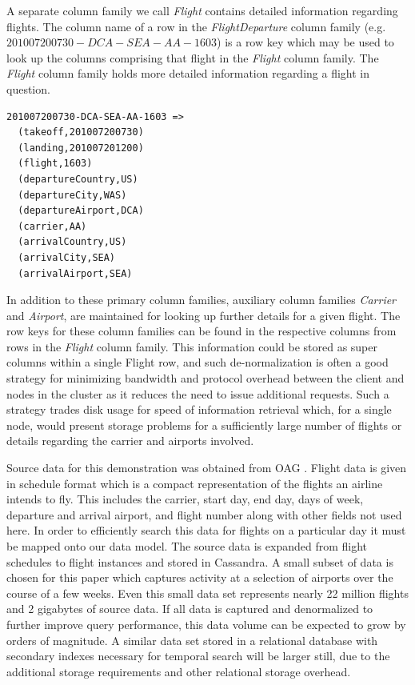 \documentclass[twocolumn]{article}
\begin{document}
A separate column family we call \emph{Flight} contains detailed information regarding flights.  The column name of a row in the \emph{FlightDeparture} column family (e.g.\ $201007200730-DCA-SEA-AA-1603$) is a row key which may be used to look up the columns comprising that flight in the \emph{Flight} column family.  The \emph{Flight} column family holds more detailed information regarding a flight in question.

\begin{verbatim}
201007200730-DCA-SEA-AA-1603 =>
  (takeoff,201007200730)  
  (landing,201007201200)
  (flight,1603)         
  (departureCountry,US)   
  (departureCity,WAS)     
  (departureAirport,DCA)  
  (carrier,AA)            
  (arrivalCountry,US)     
  (arrivalCity,SEA)       
  (arrivalAirport,SEA)    
\end{verbatim}

In addition to these primary column families, auxiliary column families \emph{Carrier} and \emph{Airport}, are maintained for looking up further details for a given flight.  The row keys for these column families can be found in the respective columns from rows in the \emph{Flight} column family.  This information could be stored as super columns within a single Flight row, and such de-normalization is often a good strategy for minimizing bandwidth and protocol overhead between the client and nodes in the cluster as it reduces the need to issue additional requests.  Such a strategy trades disk usage for speed of information retrieval which, for a single node, would present storage problems for a sufficiently large number of flights or details regarding the carrier and airports involved.

Source data for this demonstration was obtained from OAG \cite{ref:oag}.  Flight data is given in schedule format which is a compact representation of the flights an airline intends to fly.  This includes the carrier, start day, end day, days of week, departure and arrival airport, and flight number along with other fields not used here.  In order to efficiently search this data for flights on a particular day it must be mapped onto our data model.  The source data is expanded from flight schedules to flight instances and stored in Cassandra.  A small subset of data is chosen for this paper which captures activity at a selection of airports over the course of a few weeks.  Even this small data set represents nearly 22 million flights and 2 gigabytes of source data.  If all data is captured and denormalized to further improve query performance, this data volume can be expected to grow by orders of magnitude.  A similar data set stored in a relational database with secondary indexes necessary for temporal search will be larger still, due to the additional storage requirements and other relational storage overhead.
\end{document}
